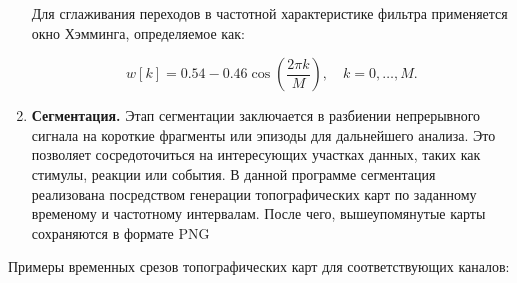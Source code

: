 \begin{enumerate}
Для сглаживания переходов в частотной характеристике фильтра применяется окно Хэмминга, определяемое как:

\begin{equation}
w[k] = 0.54 - 0.46 \cos\left( \frac{2 \pi k}{M} \right), \quad k = 0, \dots, M.
\label{eq:hamming_window}
\end{equation}

\item \textbf{Сегментация.}
\newline
Этап сегментации заключается в разбиении непрерывного сигнала на короткие фрагменты или эпизоды для дальнейшего анализа. Это позволяет сосредоточиться на интересующих участках данных, таких как стимулы, реакции или события.
В данной программе сегментация реализована посредством генерации топографических карт по заданному временому и частотному интервалам. После чего, вышеупомянутые карты сохраняются в формате PNG
\end{enumerate}
\newpage
Примеры временных срезов топографических карт для соответствующих каналов: \newline
